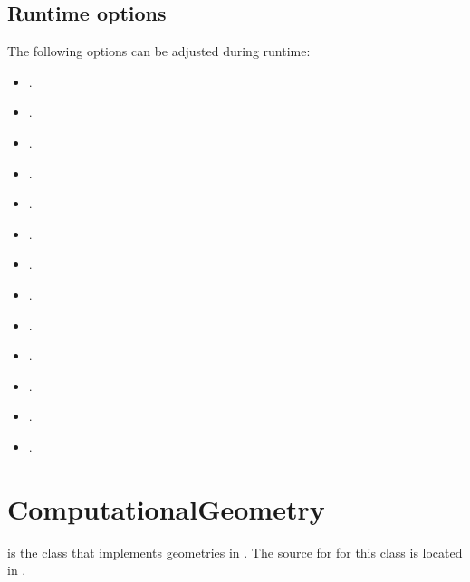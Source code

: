 \documentclass[letterpaper,10pt,english]{sphinxmanual}
\begin{document}
\subsection{Runtime options}
\label{\detokenize{Source/Driver:runtime-options}}
The following options can be adjusted during runtime:
\begin{itemize}
\item {} 
.

\item {} 
.

\item {} 
.

\item {} 
.

\item {} 
.

\item {} 
.

\item {} 
.

\item {} 
.

\item {} 
.

\item {} 
.

\item {} 
.

\item {} 
.

\item {} 
.

\end{itemize}


\section{ComputationalGeometry}
\label{\detokenize{Source/ComputationalGeometry:computationalgeometry}}\label{\detokenize{Source/ComputationalGeometry:chap-computationalgeometry}}\label{\detokenize{Source/ComputationalGeometry::doc}}
 is the class that implements geometries in .
The source for for this class is located in .
\end{document}
